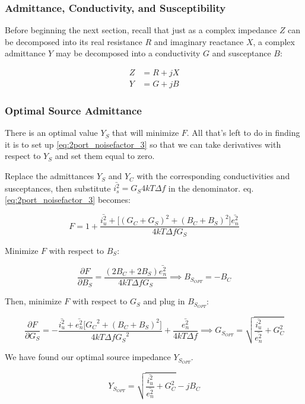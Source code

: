 \subsubsection{Admittance, Conductivity, and Susceptibility}
Before beginning the next section, recall that just as a complex impedance $Z$ can be decomposed into its real
resistance $R$ and imaginary reactance $X$, a complex admittance $Y$ may be decomposed into a conductivity $G$ and
susceptance $B$:

\begin{equation}\label{eq:admittance}
    \begin{aligned}
        Z &= R + jX\\
        Y &= G + jB
    \end{aligned}
\end{equation}

\subsubsection{Optimal Source Admittance}
There is an optimal value $Y_S$ that will minimize $F$. All that's left to do in finding it is to set up
\ref{eq:2port_noisefactor_3} so that we can take derivatives with respect to $Y_S$ and set them equal to zero.

Replace the admittances $Y_S$ and $Y_C$ with the corresponding conductivities and susceptances, then substitute
$\bar{i_s^2} = G_S 4kT\Delta f$ in the denominator. eq. \ref{eq:2port_noisefactor_3} becomes:

\begin{equation}\label{eq:2port_noisefactor_4}
    F = 1 + \frac{\bar{i_u^2} + \big[(G_C+G_S)^2 + (B_C+B_S)^2\big] \bar{e_n^2}}{4kT \Delta f G_S}
\end{equation}

Minimize $F$ with respect to $B_S$:

\begin{equation}\label{eq:partial_B_S}
    \frac{\partial F}{\partial B_S} = \frac{(2 B_C + 2 B_S) \bar{e_n^2}}{4kT\Delta f G_S} \implies B_{S_{OPT}} = -B_C
\end{equation}

Then, minimize $F$ with respect to $G_S$ and plug in $B_{S_{OPT}}$:

\begin{equation}\label{eq:partial_G_S}
    \frac{\partial F}{\partial G_S} = -\frac{\bar{i_u^2} + \bar{e_n^2} \big[{G_C}^2 + (B_C+B_S)^2 \big]}{4kT\Delta f
    {G_S}^2} + \frac{\bar{e_n^2}}{4 kT\Delta f} \implies G_{S_{OPT}} = \sqrt{\frac{\bar{i_u^2}}{\bar{e_n^2}} + G_C^2}
\end{equation}

We have found our optimal source impedance $Y_{S_{OPT}}$.

\begin{equation}\label{eq:y_opt}
    Y_{S_{OPT}} =  \sqrt{\frac{\bar{i_u^2}}{\bar{e_n^2}} + G_C^2} - j B_C
\end{equation}
